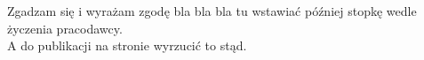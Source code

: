 \documentclass[a4paper]{res}
\begin{document}
\vspace{-0.35in}
\begin{center}
    \noindent\makebox[\dimexpr\linewidth]{\rule{\dimexpr\paperwidth-3in}{0.4pt}}
    \footnotesize
    Zgadzam się i wyrażam zgodę bla bla bla tu wstawiać później stopkę wedle życzenia pracodawcy.\\
    A do publikacji na stronie wyrzucić to stąd.
\end{center}
\end{document}
